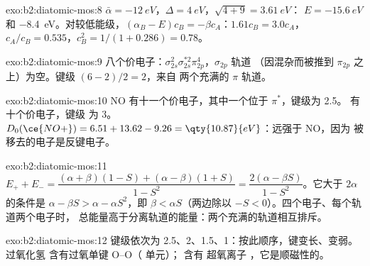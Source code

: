 \begin{solution}{exo:b2:diatomic-mos:8}
$\bar\alpha = \qty{-12}{eV}$，$\Delta = \qty{4}{eV}$，$\sqrt{4 + 9} = \qty{3.61}{eV}$：
$E = \qty{-15.6}{eV}$ 和 \qty{-8.4}{eV}。对较低能级，$(\alpha_B - E)c_B = -\beta
c_A$：$1.61c_B = 3.0c_A$，$c_A/c_B = 0.535$，$c_B^2 = 1/(1 + 0.286) = 0.78$。
\end{solution}

\begin{solution}{exo:b2:diatomic-mos:9}
八个价电子：$\sigma_{2s}^2\sigma_{2s}^{*2}\pi_{2p}^4$，$\sigma_{2p}$ 轨道
（因混杂而被推到 $\pi_{2p}$ 之上）为空。键级 $(6 - 2)/2 = 2$，来自
两个充满的 $\pi$ 轨道。
\end{solution}

\begin{solution}{exo:b2:diatomic-mos:10}
NO 有十一个价电子，其中一个位于 $\pi^*$，键级为 2.5。 有十个价电子，键级
为 3。$D_0(\ce{NO+}) = 6.51 + 13.62 - 9.26 = \qty{10.87}{eV}$：远强于 NO，因为
被移去的电子是反键电子。
\end{solution}

\begin{solution}{exo:b2:diatomic-mos:11}
$E_+ + E_- = \dfrac{(\alpha + \beta)(1 - S) + (\alpha - \beta)(1 + S)}{1 - S^2} = \dfrac{2(\alpha -
\beta S)}{1 - S^2}$。它大于 $2\alpha$ 的条件是 $\alpha - \beta S > \alpha - \alpha S^2$，即
$\beta < \alpha S$（两边除以 $-S < 0$）。四个电子、每个轨道两个电子时，
总能量高于分离轨道的能量：两个充满的轨道相互排斥。
\end{solution}

\begin{solution}{exo:b2:diatomic-mos:12}
键级依次为 2.5、2、1.5、1：按此顺序，键变长、变弱。过氧化氢
含有过氧单键 O--O（ 单元）； 含有
超氧离子 ，它是顺磁性的。
\end{solution}

